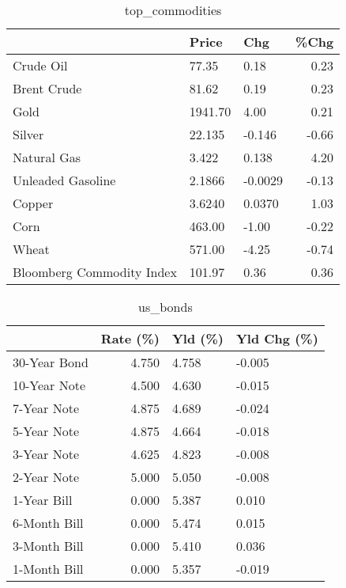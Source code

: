 \documentclass{article}%
\begin{document}
\begin{table}[htbp]%
\caption{top\_commodities}%
\centering%
\begin{adjustbox}{width=1\textwidth}%
\begin{tabular}{lllr}
\toprule
                          &   Price &     Chg &  \%Chg \\
\midrule
               Crude Oil  &   77.35 &    0.18 &  0.23 \\
             Brent Crude  &   81.62 &    0.19 &  0.23 \\
                    Gold  & 1941.70 &    4.00 &  0.21 \\
                  Silver  &  22.135 &  -0.146 & -0.66 \\
             Natural Gas  &   3.422 &   0.138 &  4.20 \\
       Unleaded Gasoline  &  2.1866 & -0.0029 & -0.13 \\
                  Copper  &  3.6240 &  0.0370 &  1.03 \\
                    Corn  &  463.00 &   -1.00 & -0.22 \\
                   Wheat  &  571.00 &   -4.25 & -0.74 \\
Bloomberg Commodity Index &  101.97 &    0.36 &  0.36 \\
\bottomrule
\end{tabular}
%
\end{adjustbox}%
\end{table}

%


\begin{table}[htbp]%
\caption{us\_bonds}%
\centering%
\begin{adjustbox}{width=1\textwidth}%
\begin{tabular}{lrll}
\toprule
             &  Rate (\%) & Yld (\%) & Yld Chg (\%) \\
\midrule
30-Year Bond &     4.750 &   4.758 &      -0.005 \\
10-Year Note &     4.500 &   4.630 &      -0.015 \\
 7-Year Note &     4.875 &   4.689 &      -0.024 \\
 5-Year Note &     4.875 &   4.664 &      -0.018 \\
 3-Year Note &     4.625 &   4.823 &      -0.008 \\
 2-Year Note &     5.000 &   5.050 &      -0.008 \\
 1-Year Bill &     0.000 &   5.387 &       0.010 \\
6-Month Bill &     0.000 &   5.474 &       0.015 \\
3-Month Bill &     0.000 &   5.410 &       0.036 \\
1-Month Bill &     0.000 &   5.357 &      -0.019 \\
\bottomrule
\end{tabular}
%
\end{adjustbox}%
\end{table}
\end{document}
